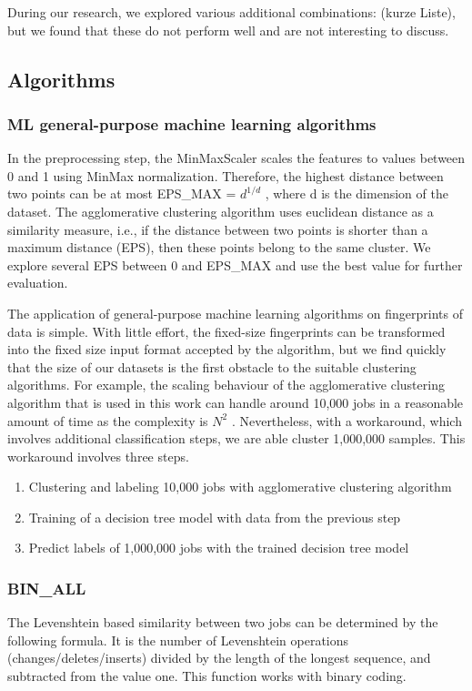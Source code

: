 \documentclass[]{llncs}
\begin{document}
During our research, we explored various additional combinations: (kurze Liste), but we found that these do not perform well and are not interesting to discuss.

\subsection{Algorithms }
\subsubsection{ML general-purpose machine learning algorithms}
In the preprocessing step, the MinMaxScaler scales the features to values between 0 and 1 using MinMax normalization.
Therefore, the highest distance between two points can be at most EPS\_MAX =  \( d^{1/d} \) , where d is the dimension of the dataset.
The agglomerative clustering algorithm uses euclidean distance as a similarity measure, i.e., if the distance between two points is shorter than a maximum distance (EPS), then these points belong to the same cluster.
We explore several EPS between 0 and EPS\_MAX and use the best value for further evaluation.

The application of general-purpose machine learning algorithms on fingerprints of data is simple.
With little effort, the fixed-size fingerprints can be transformed into the fixed size input format accepted by the algorithm, but we find quickly that the size of our datasets is the first obstacle to the suitable clustering algorithms.
For example, the scaling behaviour of the agglomerative clustering algorithm that is used in this work can handle around 10,000 jobs in a reasonable amount of time as the complexity is  \( N^{2} \) .
Nevertheless, with a workaround, which involves additional classification steps, we are able cluster 1,000,000 samples.
This workaround involves three steps.

\begin{enumerate}
 \item Clustering and labeling 10,000 jobs with agglomerative clustering algorithm
 \item Training of a decision tree model with data from the previous step
 \item Predict labels of 1,000,000 jobs with the trained decision tree model
\end{enumerate}

\subsubsection{BIN\_ALL}
The Levenshtein based similarity between two jobs can be determined by the following formula.
It is the number of Levenshtein operations (changes/deletes/inserts) divided by the length of the longest sequence, and subtracted from the value one.
This function works with binary coding.
\end{document}
